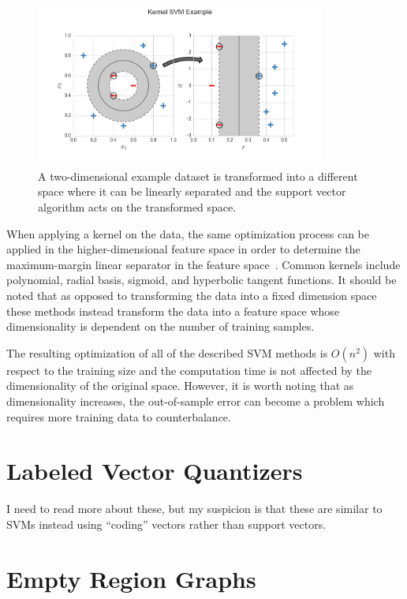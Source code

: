 \documentclass[12pt]{article}
\begin{document}
\begin{figure}[!ht]
  \centering
  \includegraphics[width=0.85\textwidth]{figs/chap3/kernelSvmExample}
  \caption[Kernel Support Vector Machine Example]{A two-dimensional example
  dataset is transformed into a different space where it can be linearly
  separated and the support vector algorithm acts on the transformed space.}
  \label{fig:kernelSvmExample}
\end{figure}

When applying a kernel on the data, the same optimization process can be applied
in the higher-dimensional feature space in order to determine the maximum-margin
linear separator in the feature space~\cite{BoserGuyonVapnik1992}.
%
Common kernels include polynomial, radial basis, sigmoid, and hyperbolic tangent
functions.
%
It should be noted that as opposed to transforming the data into a fixed
dimension space these methods instead transform the data into a feature space
whose dimensionality is dependent on the number of training samples.

The resulting optimization of all of the described SVM methods is $O(n^2)$ with
respect to the training size and the computation time is not affected by the
dimensionality of the original space.
%
However, it is worth noting that as dimensionality increases, the out-of-sample
error can become a problem which requires more training data to counterbalance.

\section{Labeled Vector Quantizers}

I need to read more about these, but my suspicion is that these are similar to
SVMs instead using ``coding'' vectors rather than support vectors.

\section{Empty Region Graphs}
\end{document}

